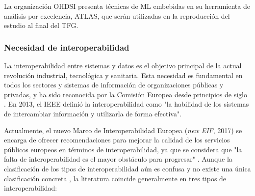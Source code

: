 \begin{itemize}
La organización OHDSI presenta técnicas de ML embebidas en su herramienta de análisis por excelencia, ATLAS, que serán utilizadas en la reproducción del estudio al final del TFG.

\end{itemize}

\subsubsection{Necesidad de interoperabilidad}


La interoperabilidad entre sistemas y datos es el objetivo principal de la actual revolución industrial, tecnológica y sanitaria. Esta necesidad es fundamental en todos los sectores y sistemas de información de organizaciones públicas y privadas, y ha sido reconocida por la Comisión Europea desde principios de siglo \cite{CEU1999ida}. En 2013, el IEEE definió la interoperabilidad como "la habilidad de los sistemas de intercambiar información y utilizarla de forma efectiva". 

Actualmente, el nuevo Marco de Interoperabilidad Europea (\textit{new EIF}, 2017) se encarga de ofrecer recomendaciones para mejorar la calidad de los servicios públicos europeos en términos de interoperabilidad, ya que se considera que "la falta de interoperabilidad es el mayor obstáculo para progresar" \cite{kouroubali2019new}. Aunque la clasificación de los tipos de interoperabilidad aún es confusa y no existe una única clasificación concreta \cite{santos2021interoperability}, la literatura coincide generalmente en tres tipos de interoperabilidad:

